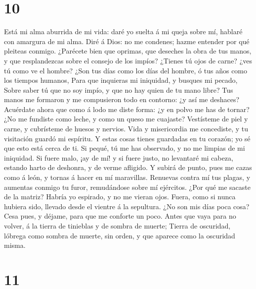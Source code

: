 \hypertarget{section-9}{%
\section{10}\label{section-9}}

 Está mi alma aburrida de mi vida: daré yo suelta á mi
queja sobre mí, hablaré con amargura de mi alma.  Diré á
Dios: no me condenes; hazme entender por qué pleiteas conmigo.
 ¿Parécete bien que oprimas, que deseches la obra de tus
manos, y que resplandezcas sobre el consejo de los impíos?
 ¿Tienes tú ojos de carne? ¿ves tú como ve el hombre?
 ¿Son tus días como los días del hombre, ó tus años como
los tiempos humanos,  Para que inquieras mi iniquidad, y
busques mi pecado,  Sobre saber tú que no soy impío, y que
no hay quien de tu mano libre?  Tus manos me formaron y me
compusieron todo en contorno: ¿y así me deshaces? 
Acuérdate ahora que como á lodo me diste forma: ¿y en polvo me has de
tornar?  ¿No me fundiste como leche, y como un queso me
cuajaste?  Vestísteme de piel y carne, y cubrísteme de
huesos y nervios.  Vida y misericordia me concediste, y
tu visitación guardó mi espíritu.  Y estas cosas tienes
guardadas en tu corazón; yo sé que esto está cerca de ti.
 Si pequé, tú me has observado, y no me limpias de mi
iniquidad.  Si fuere malo, ¡ay de mí! y si fuere justo,
no levantaré mi cabeza, estando harto de deshonra, y de verme afligido.
 Y subirá de punto, pues me cazas como á león, y tornas á
hacer en mí maravillas.  Renuevas contra mí tus plagas, y
aumentas conmigo tu furor, remudándose sobre mí ejércitos.
 ¿Por qué me sacaste de la matriz? Habría yo espirado, y
no me vieran ojos.  Fuera, como si nunca hubiera sido,
llevado desde el vientre á la sepultura.  ¿No son mis
días poca cosa? Cesa pues, y déjame, para que me conforte un poco.
 Antes que vaya para no volver, á la tierra de tinieblas
y de sombra de muerte;  Tierra de oscuridad, lóbrega como
sombra de muerte, sin orden, y que aparece como la oscuridad misma.

\hypertarget{section-10}{%
\section{11}\label{section-10}}

